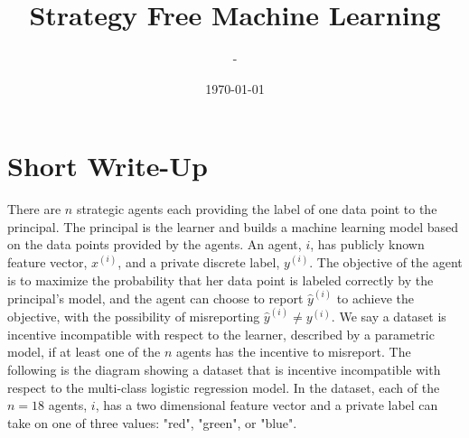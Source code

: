 \documentclass{article}
\title{Strategy Free Machine Learning}
\author{-}
\date{\today}
\begin{document}
\newtheorem{thm}{Theorem}
\newtheorem{cor}{Corollary}
\newtheorem{lem}{Lemma}
\newtheorem{prop}{Proposition}
\newtheorem{conj}{Conjecture}
\newtheorem{algo}{Algorithm}
\newtheorem{obs}{Observation}
\newtheorem{clm}{Claim}
\theoremstyle{definition}
\newtheorem{df}{Definition}
\newtheorem{eg}{Example}
\newtheorem{asm}{Assumption}
\newtheorem{cond}{Condition}
\theoremstyle{remark}
\newtheorem{rmk}{Remark}
\maketitle \onehalfspacing \allowdisplaybreaks \raggedbottom


\section{Short Write-Up} 
There are $n $ strategic agents each providing the label of one data point to the principal. The principal is the learner and builds a machine learning model based on the data points provided by the agents. An agent, $i $, has publicly known feature vector, $x^{\left(i\right)}$, and a private discrete label, $y^{\left(i\right)}$. The objective of the agent is to maximize the probability that her data point is labeled correctly by the principal's model, and the agent can choose to report $\hat{y} ^{\left(i\right)}$ to achieve the objective, with the possibility of misreporting $\hat{y} ^{\left(i\right)} \neq  y^{\left(i\right)}$. We say a dataset is incentive incompatible with respect to the learner, described by a parametric model, if at least one of the $n $ agents has the incentive to misreport.
\newline \newline
The following is the diagram showing a dataset that is incentive incompatible with respect to the multi-class logistic regression model. In the dataset, each of the $n  = 18$ agents, $i $, has a two dimensional feature vector and a private label can take on one of three values: "red", "green", or "blue".
\newline \newline
\end{document}
